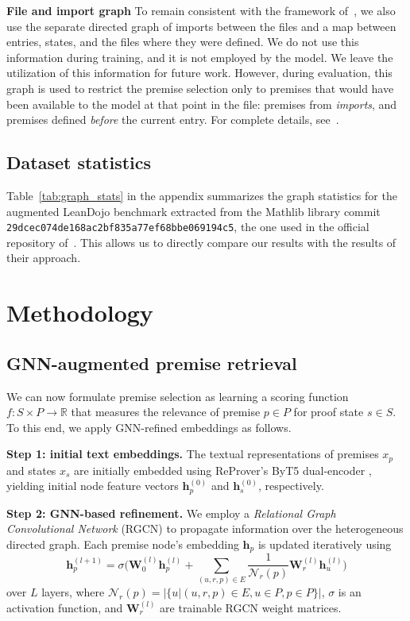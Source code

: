 \textbf{File and import graph} To remain consistent with the framework of~\citep{yang2023leandojo}, we also use the separate directed graph of imports between the files and a map between entries, states, and the files where they were defined. We do not use this information during training, and it is not employed by the model. We leave the utilization of this information for future work. However, during evaluation, this graph is used to restrict the premise selection only to premises that would have been available to the model at that point in the file: premises from \textit{imports}, and premises defined \textit{before} the current entry. For complete details, see~\citep{yang2023leandojo}. 

\subsection{Dataset statistics}
Table~\ref{tab:graph_stats} in the appendix summarizes the graph statistics for the augmented LeanDojo benchmark extracted from the Mathlib library commit \texttt{29dcec074de168ac2bf835a77ef68bbe069194c5}, the one used in the official repository of~\citep{yang2023leandojo}. This allows us to directly compare our results with the results of their approach.


\section{Methodology}

\subsection{GNN-augmented premise retrieval}
We can now formulate premise selection as learning a scoring function $f \colon S \times P \to \mathbb{R}$ that measures the relevance of premise $p \in P$ for proof state $s \in S$. To this end, we apply GNN-refined embeddings as follows.

\textbf{Step 1: initial text embeddings.} The textual representations of premises $x_p$ and states $x_s$ are initially embedded using ReProver's ByT5 dual-encoder \citep{yang2023leandojo}, yielding initial node feature vectors $\mathbf{h}_p^{(0)}$ and $\mathbf{h}_s^{(0)}$, respectively. 

\textbf{Step 2: GNN-based refinement.} We employ a \textit{Relational Graph Convolutional Network} (RGCN) \citep{schlichtkrull2018rgcn} to propagate information over the heterogeneous directed graph. Each premise node's embedding $\mathbf{h}_p$ is updated iteratively using
$$
    \mathbf{h}_p^{(l+1)} = \sigma \Bigg( \mathbf{W}_0^{(l)} \mathbf{h}_p^{(l)} + \sum_{(u, r, p) \in E} \frac{1}{\mathcal{N}_r(p)} \mathbf{W}_r^{(l)} \mathbf{h}_u^{(l)} \Bigg)
$$
over $L$ layers, where $\mathcal{N}_r(p) = |\{u | (u, r, p) \in E, u \in P, p \in P\}|$, $\sigma$ is an activation function, and $\mathbf{W}_{r}^{(l)}$ are trainable RGCN weight matrices.

